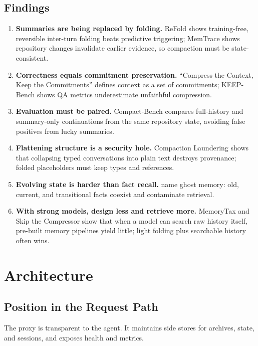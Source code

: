 \documentclass[11pt,a4paper]{article}
\begin{document}
\subsection{Findings}
\begin{enumerate}
  \item \textbf{Summaries are being replaced by folding.} ReFold \cite{refold} shows training-free, reversible inter-turn folding beats predictive triggering; MemTrace \cite{memtrace} shows repository changes invalidate earlier evidence, so compaction must be state-consistent.
  \item \textbf{Correctness equals commitment preservation.} ``Compress the Context, Keep the Commitments'' \cite{commitments} defines context as a set of commitments; KEEP-Bench \cite{keepbench} shows QA metrics underestimate unfaithful compression.
  \item \textbf{Evaluation must be paired.} Compact-Bench \cite{compactbench} compares full-history and summary-only continuations from the same repository state, avoiding false positives from lucky summaries.
  \item \textbf{Flattening structure is a security hole.} Compaction Laundering \cite{laundering} shows that collapsing typed conversations into plain text destroys provenance; folded placeholders must keep types and references.
  \item \textbf{Evolving state is harder than fact recall.} \cite{evolving,atma} name ghost memory: old, current, and transitional facts coexist and contaminate retrieval.
  \item \textbf{With strong models, design less and retrieve more.} MemoryTax \cite{memorytax} and Skip the Compressor \cite{skipcompressor} show that when a model can search raw history itself, pre-built memory pipelines yield little; light folding plus searchable history often wins.
\end{enumerate}

\section{Architecture}

\subsection{Position in the Request Path}
The proxy is transparent to the agent. It maintains side stores for archives, state, and sessions, and exposes health and metrics.
\end{document}
